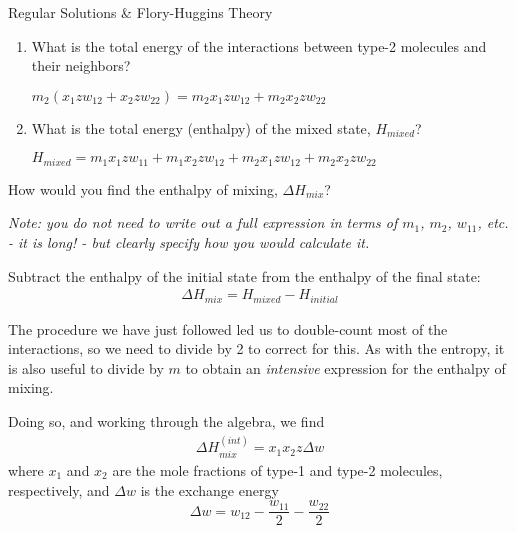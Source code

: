 \begin{activity}{Regular Solutions \& Flory-Huggins Theory}
\begin{ctqs}
\begin{enumerate}
			\item What is the total energy of the interactions between type-2 molecules and their neighbors?
			
				\begin{solution}[1in]{}
					$m_2(x_1 z w_{12} + x_2 z w_{22}) = m_2 x_1 z w_{12} + m_2 x_2 z w_{22}$
				\end{solution}
				
			\item What is the total energy (enthalpy) of the mixed state, $H_{mixed}$?
			
				\begin{solution}[1in]{}
				
					$H_{mixed} = m_1 x_1 z w_{11} + m_1 x_2 z w_{12} + m_2 x_1 z w_{12} + m_2 x_2 z w_{22}$
				
				\end{solution}
				
		\end{enumerate}
		
	\question How would you find the enthalpy of mixing, $\Delta H_{mix}$?
	
		\emph{Note: you do not need to write out a full expression in terms of $m_1$, $m_2$, $w_{11}$, etc. - it is long! - but clearly specify how you would calculate it.}
	
		\begin{solution}[1.25in]{}
		
			Subtract the enthalpy of the initial state from the enthalpy of the final state:
			\begin{align*}
				\Delta H_{mix} = H_{mixed} - H_{initial}
			\end{align*}
		
		\end{solution}
		
\end{ctqs}

\begin{infobox}
The procedure we have just followed led us to double-count most of the interactions, so we need to divide by 2 to correct for this.  As with the entropy, it is also useful to divide by $m$ to obtain an \emph{intensive} expression for the enthalpy of mixing.
	
		Doing so, and working through the algebra, we find
		\begin{align*}
			\Delta H_{mix}^{(int)} %
					= x_1 x_2 z \Delta w
		\end{align*}
		where $x_1$ and $x_2$ are the mole fractions of type-1 and type-2 molecules, respectively, and $\Delta w$ is the exchange energy
		\begin{equation*}
			\Delta w = w_{12} - \frac{w_{11}}{2} - \frac{w_{22}}{2}
		\end{equation*}
\end{infobox}


\end{activity}
